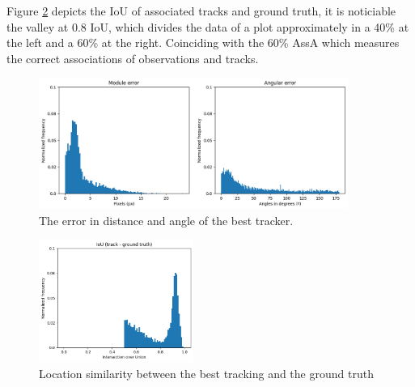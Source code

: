 {
	Figure \ref{fig:tracker_iou_with_gt} depicts the IoU of associated tracks and ground truth, 
	it is noticiable the valley at 0.8 IoU, which divides the data of a plot approximately in a 40\% at the left and a 60\% at the right. 
	Coinciding with the 60\% \ac{AssA} which measures the correct associations of observations and tracks.
}


\begin{figure}[!hp]
    \centering
    \includegraphics[width=0.9\textwidth]{figures/06_results/da/TrackerError.png}
    \caption[Displacement and angular error of the best tracker]{\footnotesize{The error in distance and angle of the best tracker.}}
    \label{fig:tracker_errors}
\end{figure}

\begin{figure}[!hp]
    \centering
    \includegraphics[width=0.45\textwidth]{figures/06_results/da/TrackerIoU_GT.png}
    \caption[Location similarity between the best tracking and the ground truth]{\footnotesize{Location similarity between the best tracking and the ground truth}}
    \label{fig:tracker_iou_with_gt}
\end{figure}

\FloatBarrier

%
%
